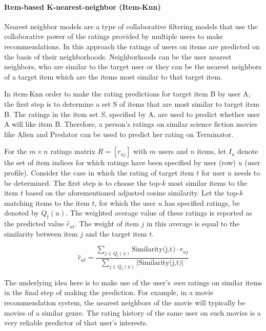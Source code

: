         \vspace{0.25cm}
        \noindent \paragraph{Item-based K-nearest-neighbor (Item-Knn)}
        \vspace{0.25cm}
        
            Nearest neighbor models are a type of collaborative filtering models that use the collaborative power of the ratings provided by multiple users to make recommendations. In this approach the ratings of users on items are predicted on the basis of their neighborhoods. Neighborhoods can be the user nearest neighbors, who are similar to the target user or they can be the nearest neighbors of a target item which are the items most similar to that target item.
        
            In item-Knn order to make the rating predictions for target item B by user A, the first step is to determine a set S of items that are most similar to target item B. The ratings in the item set $S$, specified by A, are used to predict whether user A will like item B. Therefore, a person's ratings on similar science fiction movies like Alien and Predator can be used to predict her rating on Terminator.
    
            For the $m \times n$ ratings matrix $R = [r_{uj}]$ with $m$ users and $n$ items, let $I_u$ denote the set of item indices for which ratings have been specified by user (row) $u$ (user profile). Consider the case in which the rating of target item $t$ for user $u$ needs to be determined. The first step is to choose the top-$k$ most similar items to the item $t$ based on the aforementioned adjusted cosine similarity. Let the top-$k$ matching items to the item $t$, for which the user $u$ has specified ratings, be denoted by $Q_{t}(u)$. The weighted average value of these ratings is reported as the predicted value $\hat{r}_{ut}$. The weight of item $j$ in this average is equal to the similarity between item $j$ and the target item $t$.
        
            \begin{equation}
                \hat{r}_{ut} = \frac{\sum_{j \in Q_{t}(u)} \text{Similarity(j,t)} \cdot r_{uj}}{\sum_{j \in Q_{t}(u)} |\text{Similarity(j,t)}|}
            \end{equation}
            \vspace{0.25cm}
        
            The underlying idea here is to make use of the user’s \textit{own} ratings on similar items in the final step of making the prediction. For example, in a movie recommendation system, the nearest neighbors of the movie will typically be movies of a similar genre. The rating history of the same user on such movies is a very reliable predictor of that user's interests.
        
